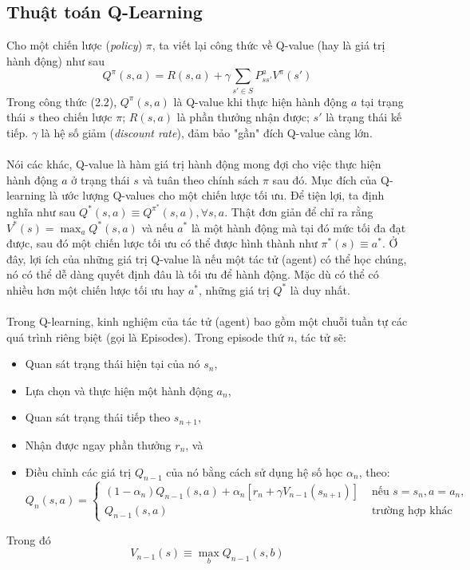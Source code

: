 \documentclass[12pt,a4paper]{report}
\begin{document}
\subsection{Thuật toán Q-Learning}
Cho một chiến lược (\textit{policy}) $\pi$, ta viết lại công thức về Q-value
(hay là giá trị hành động) như sau \begin{equation}
	Q^{\pi}(s, a) = R(s, a) + \gamma\sum_{s'\in S} P^a_{ss'}V^{\pi}(s')
\end{equation}
Trong công thức (2.2), $Q^{\pi}(s, a)$ là Q-value khi thực hiện hành động $a$ tại trạng thái $s$ theo chiến
lược $\pi$; $R(s,a)$ là phần thưởng nhận được; $s'$ là trạng thái kế tiếp. $\gamma$ là hệ số giảm (\textit{discount
rate}), đảm bảo "gần" đích Q-value càng lớn. \\\\ Nói các khác, Q-value là hàm giá trị hành động mong đợi cho việc thực hiện hành động $a$ ở
trạng thái $s$ và tuân theo chính sách $\pi$ sau đó. Mục đích của Q-learning là ước lượng Q-values
cho một chiến lược tối ưu. Để tiện lợi, ta định nghĩa như sau $Q^*(s, a) \equiv Q^{\pi^*}(s, a), \forall s, a.$ Thật
đơn giản để chỉ ra rằng $V^*(s) = \max_aQ^*(s, a)$ và nếu $a^*$ là một hành động mà tại đó mức tối
đa đạt được, sau đó một chiến lược tối ưu có thể được hình thành như $\pi^*(s) \equiv a^*$. Ở đây, lợi
ích của những giá trị Q-value là nếu một tác tử (agent) có thể học chúng, nó có thể dễ dàng
quyết định đâu là tối ưu để hành động. Mặc dù có thể có nhiều hơn một chiến lược tối ưu hay
$a^*$, những giá trị $Q^*$ là duy nhất. \\\\ Trong Q-learning, kinh nghiệm của tác tử (agent) bao gồm một chuỗi tuần tự các quá
trình riêng biệt (gọi là Episodes). Trong episode thứ $n$, tác tử sẽ:
\begin{itemize}
	\item Quan sát trạng thái hiện tại của nó $s_n$, 
	\item  Lựa chọn và thực hiện một hành động $a_n$,
	\item Quan sát trạng thái tiếp theo $s_{n+1}$,
	\item Nhận được ngay phần thưởng $r_n$, và
	\item Điều chỉnh các giá trị $Q_{n-1}$ của nó bằng cách sử dụng hệ số học $\alpha_n$, theo: 
	\begin{equation}
		Q_n(s, a) = \begin{cases}
		(1-\alpha_n)Q_{n-1}(s, a) + \alpha_n[r_n + \gamma V_{n-1}(s_{n+1})] & \text{ nếu } s=s_n, a = a_n, \\ Q_{n-1}(s, a) & \text{ trường hợp khác }
		\end{cases}
	\end{equation}
\end{itemize} Trong đó \begin{equation}
V_{n-1}(s) \equiv \max_bQ_{n-1}(s, b)
\end{equation}
\end{document}
